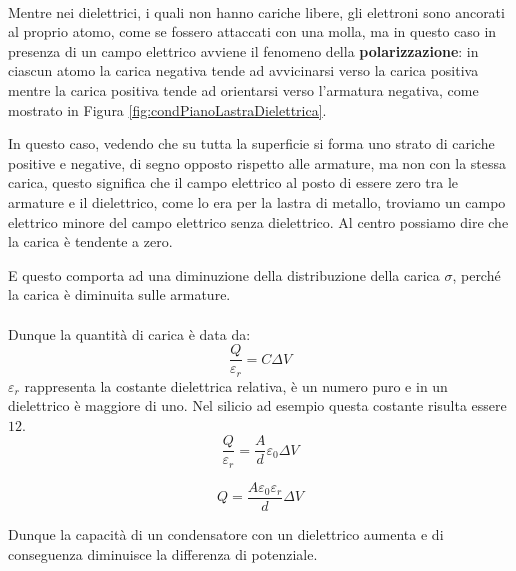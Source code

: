 \paragraph{}
Mentre nei dielettrici, i quali non hanno cariche libere, gli elettroni sono ancorati al proprio atomo, come se fossero attaccati con una molla, ma in questo caso in presenza di un campo elettrico avviene il fenomeno della \textbf{polarizzazione}: in ciascun atomo la carica negativa tende ad avvicinarsi verso la carica positiva mentre la carica positiva tende ad orientarsi verso l'armatura negativa, come mostrato in Figura \ref{fig:condPianoLastraDielettrica}.

In questo caso, vedendo che su tutta la superficie si forma uno strato di cariche positive e negative, di segno opposto rispetto alle armature, ma non con la stessa carica, questo significa che il campo elettrico al posto di essere zero tra le armature e il dielettrico, come lo era per la lastra di metallo, troviamo un campo elettrico minore del campo elettrico senza dielettrico. Al centro possiamo dire che la carica è tendente a zero.

E questo comporta ad una diminuzione della distribuzione della carica $\sigma$, perché la carica è diminuita sulle armature.
\paragraph{}
Dunque la quantità di carica è data da:
\begin{equation*}
    \frac{Q}{\varepsilon_r} = C \Delta V
\end{equation*}
$\varepsilon_r$ rappresenta la costante dielettrica relativa, è un numero puro e in un dielettrico è maggiore di uno. Nel silicio ad esempio questa costante risulta essere $12$.
\begin{equation*}
    \frac{Q}{\varepsilon_r} = \frac{A}{d}\varepsilon_0 \Delta V
\end{equation*}

\begin{equation}
    Q = \frac{A\varepsilon_0\varepsilon_r}{d} \Delta V
\end{equation}

Dunque la capacità di un condensatore con un dielettrico aumenta e di conseguenza diminuisce la differenza di potenziale.


\def\dpa{0.28}
\def\dba{0.14}
\def\dipole#1#2{
  \begin{scope}[shift={(#1)},rotate=#2]
    \draw[charge-] (-\dpa,0) to[out=90,in=180] (0,\dba) -- (0,-\dba) to[out=180,in=-90] cycle;
    \draw[charge+] ( \dpa,0) to[out=90,in=  0] (0,\dba) -- (0,-\dba) to[out=  0,in=-90] cycle;
    \node[scale=0.7] at (-\dpa/2,0) {$-$};
    \node[scale=0.7] at ( \dpa/2,0) {$+$};
  \end{scope}
}

